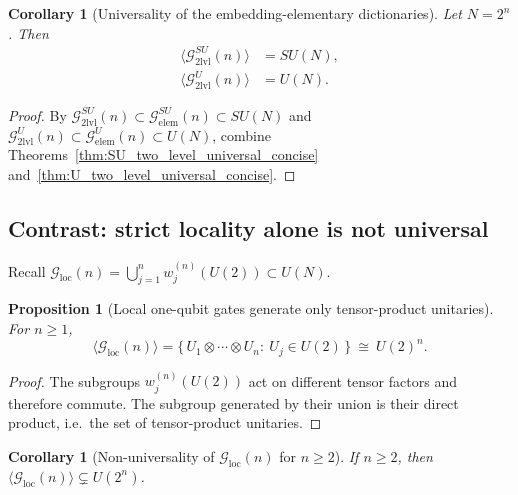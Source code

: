 \documentclass{article}%
\newtheorem{proposition}[theorem]{Proposition}
\newtheorem{corollary}[theorem]{Corollary}
\theoremstyle{definition}
\numberwithin{equation}{section}
\begin{document}
\begin{corollary}[Universality of the embedding-elementary dictionaries]
\label{cor:universality_elem_from_2lvl_concise}
Let $N=2^n$. Then
\[
\begin{aligned}
\big\langle \mathcal{G}^{SU}_{\mathrm{2lvl}}(n)\big\rangle &= SU(N),\\
\big\langle \mathcal{G}^{U}_{\mathrm{2lvl}}(n)\big\rangle &= U(N).
\end{aligned}
\]
\end{corollary}

\begin{proof}
By $\mathcal{G}^{SU}_{\mathrm{2lvl}}(n)\subset \mathcal{G}^{SU}_{\mathrm{elem}}(n)\subset SU(N)$ and
$\mathcal{G}^{U}_{\mathrm{2lvl}}(n)\subset \mathcal{G}^{U}_{\mathrm{elem}}(n)\subset U(N)$, combine
Theorems~\ref{thm:SU_two_level_universal_concise} and~\ref{thm:U_two_level_universal_concise}.
\end{proof}

\subsection{Contrast: strict locality alone is not universal}
\label{subsec:local_not_universal}

Recall $\mathcal{G}_{\mathrm{loc}}(n)=\bigcup_{j=1}^n w_j^{(n)}(U(2))\subset U(N)$.

\begin{proposition}[Local one-qubit gates generate only tensor-product unitaries]
\label{prop:Gloc_generated_group_concise}
For $n\ge 1$,
\[
\big\langle \mathcal{G}_{\mathrm{loc}}(n)\big\rangle
=
\{\,U_1\otimes\cdots\otimes U_n:\ U_j\in U(2)\,\}
\ \cong\ U(2)^n.
\]
\end{proposition}

\begin{proof}
The subgroups $w_j^{(n)}(U(2))$ act on different tensor factors and therefore commute. The subgroup generated by their union is their
direct product, i.e.\ the set of tensor-product unitaries.
\end{proof}

\begin{corollary}[Non-universality of $\mathcal{G}_{\mathrm{loc}}(n)$ for $n\ge2$]
\label{cor:Gloc_not_universal_concise}
If $n\ge2$, then $\langle \mathcal{G}_{\mathrm{loc}}(n)\rangle\subsetneq U(2^n)$.
\end{corollary}
\end{document}
